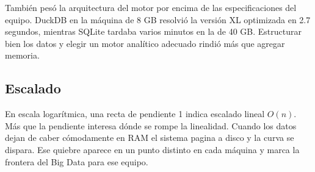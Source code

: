 También pesó la arquitectura del motor por encima de las especificaciones del equipo. DuckDB en la máquina de 8 GB resolvió la versión XL optimizada en 2.7 segundos, mientras SQLite tardaba varios minutos en la de 40 GB. Estructurar bien los datos y elegir un motor analítico adecuado rindió más que agregar memoria.

\subsection{Escalado}

En escala logarítmica, una recta de pendiente 1 indica escalado lineal $O(n)$. Más que la pendiente interesa dónde se rompe la linealidad. Cuando los datos dejan de caber cómodamente en RAM el sistema pagina a disco y la curva se dispara. Ese quiebre aparece en un punto distinto en cada máquina y marca la frontera del Big Data para ese equipo.
